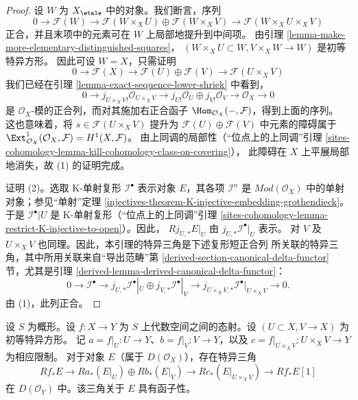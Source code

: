 \begin{proof}
设 $W$ 为 $X_\etale$ 中的对象。我们断言，序列
$$
0 \to
\mathcal{F}(W) \to
\mathcal{F}(W \times_X U) \oplus \mathcal{F}(W \times_X V) \to
\mathcal{F}(W \times_X U \times_X V)
$$
正合，并且末项中的元素可在 $W$ 上局部地提升到中间项。
由引理 \ref{lemma-make-more-elementary-distinguished-squares}，
$(W \times_X U \subset W, V \times_X W \to W)$ 是初等特异方形。
因此可设 $W = X$，只需证明
$$
0 \to
\mathcal{F}(X) \to
\mathcal{F}(U) \oplus \mathcal{F}(V) \to
\mathcal{F}(U \times_X V)
$$
我们已经在引理 \ref{lemma-exact-sequence-lower-shriek} 中看到，
$$
0 \to j_{U \times_X V!}\mathcal{O}_{U \times_X V}
\to j_{U!}\mathcal{O}_U \oplus
j_{V!}\mathcal{O}_V \to
\mathcal{O}_X \to 0
$$
是 $\mathcal{O}_X$-模的正合列，而对其施加右正合函子
$\Hom_{\mathcal{O}_X}(- , \mathcal{F})$，得到上面的序列。 %
这也意味着，将 $s \in \mathcal{F}(U \times_X V)$ 提升为
$\mathcal{F}(U) \oplus \mathcal{F}(V)$ 中元素的障碍属于
$\Ext^1_{\mathcal{O}_X}(\mathcal{O}_X, \mathcal{F}) = H^1(X, \mathcal{F})$。
由上同调的局部性（“位点上的上同调”引理
\ref{sites-cohomology-lemma-kill-cohomology-class-on-covering}），
此障碍在 $X$ 上平展局部地消失，故 (1) 的证明完成。

\medskip\noindent
证明 (2)。选取 K-单射复形 $\mathcal{I}^\bullet$ 表示对象 $E$，其各项
$\mathcal{I}^n$ 是 $\textit{Mod}(\mathcal{O}_X)$ 中的单射对象；参见“单射”定理
\ref{injectives-theorem-K-injective-embedding-grothendieck}。
于是 $\mathcal{I}^\bullet|U$ 是 K-单射复形（“位点上的上同调”引理
\ref{sites-cohomology-lemma-restrict-K-injective-to-open}）。因此，
$Rj_{U, *}E|_U$ 由 $j_{U, *}\mathcal{I}^\bullet|_U$ 表示。
对 $V$ 及 $U \times_X V$ 也同理。因此，本引理的特异三角是下述复形短正合列
所关联的特异三角，其中所用关联来自“导出范畴”第
\ref{derived-section-canonical-delta-functor} 节，尤其是引理
\ref{derived-lemma-derived-canonical-delta-functor}：
$$
0 \to
\mathcal{I}^\bullet \to
j_{U, *}\mathcal{I}^\bullet|_U \oplus j_{V, *}\mathcal{I}^\bullet|_V \to
j_{U \times_X V, *}\mathcal{I}^\bullet|_{U \times_X V} \to
0.
$$
由 (1)，此列正合。
\end{proof}
\begin{lemma}
\label{lemma-unbounded-relative-mayer-vietoris}
设 $S$ 为概形。设 $f : X \to Y$ 为
$S$ 上代数空间之间的态射。设 $(U \subset X, V \to X)$ 为初等特异方形。
记
$a = f|_U : U \to Y$、$b = f|_V : V \to Y$，以及
$c = f|_{U \times_X V} : U \times_X V \to Y$ 为相应限制。
对于对象 $E$（属于 $D(\mathcal{O}_X)$），存在特异三角
$$
Rf_*E \to
Ra_*(E|_U) \oplus Rb_*(E|_V) \to
Rc_*(E|_{U \times_X V}) \to
Rf_*E[1]
$$
在 $D(\mathcal{O}_Y)$ 中。该三角关于 $E$ 具有函子性。
\end{lemma}

